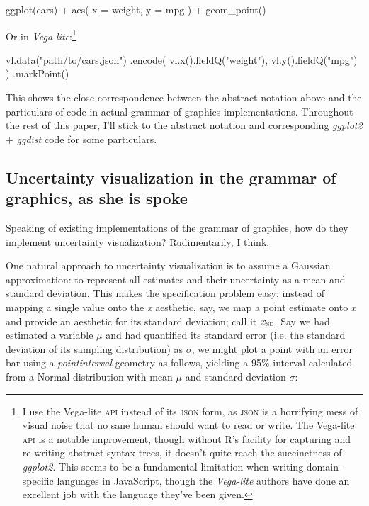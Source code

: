 \documentclass[journal]{vgtc}              %
\newenvironment{centerverbatim}{%
  \hfill\break
  \small
  \centering
  \varwidth{\linewidth}%
  \verbatim
}{%
  \endverbatim
  \endvarwidth
  \par
  \hfill\break
}
\begin{document}
\begin{centerverbatim}
ggplot(cars) +
  aes(
    x = weight,
    y = mpg
  ) +
  geom_point()
\end{centerverbatim}

Or in \textit{Vega-lite}:\footnote{I use the Vega-lite \textsc{api} instead of its \textsc{json} form, as \textsc{json} is a horrifying mess of visual noise that no sane human should want to read or write. The Vega-lite \textsc{api} is a notable improvement, though without R's facility for capturing and re-writing abstract syntax trees, it doesn't quite reach the succinctness of \textit{ggplot2}. This seems to be a fundamental limitation when writing domain-specific languages in JavaScript, though the \textit{Vega-lite} authors have done an excellent job with the language they've been given.}

\begin{centerverbatim}
vl.data("path/to/cars.json")
  .encode(
    vl.x().fieldQ("weight"),
    vl.y().fieldQ("mpg")
  )
  .markPoint()
\end{centerverbatim}

This shows the close correspondence between the abstract notation above and the particulars of code in actual grammar of graphics implementations. Throughout the rest of this paper, I'll stick to the abstract notation and corresponding \textit{ggplot2} + \textit{ggdist} code for some particulars.

\subsection{Uncertainty visualization in the grammar of graphics, as she is spoke}

Speaking of existing implementations of the grammar of graphics, how do they implement uncertainty visualization? Rudimentarily, I think.

One natural approach to uncertainty visualization is to assume a Gaussian approximation: to represent all estimates and their uncertainty as a mean and standard deviation. This makes the specification problem easy: instead of mapping a single value onto the \textit{x} aesthetic, say, we map a point estimate onto \textit{x} and provide an aesthetic for its standard deviation; call it $x_\textsc{sd}$. Say we had estimated a variable $\mu$ and had quantified its standard error (i.e. the standard deviation of its sampling distribution) as $\sigma$, we might plot a point with an error bar using a \textit{pointinterval} geometry as follows, yielding a 95\% interval calculated from a Normal distribution with mean $\mu$ and standard deviation $\sigma$:
\end{document}
